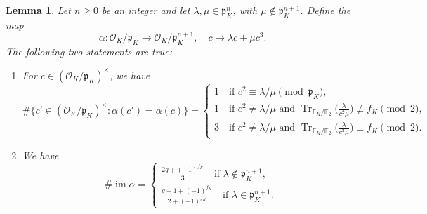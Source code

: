 \documentclass[11pt]{amsart}
\theoremstyle{theorem}
\newtheorem{lemma}[theorem]{Lemma}
\theoremstyle{example}
\theoremstyle{definition}
\numberwithin{theorem}{section}
\numberwithin{theorem}{section}
\DeclareMathOperator{\im}{im}
\DeclareMathOperator{\Tr}{Tr}
\newcommand{\co}{\mathcal{O}}
\newcommand{\F}{\mathbb{F}}
\newcommand{\p}{\mathfrak{p}}
\begin{document}
\begin{lemma}
    \label{lem-size-of-im-alpha}
    Let $n \geq 0$ be an integer and let $\lambda, \mu \in \p_K^n$, with $\mu \not \in \p_K^{n+1}$. Define the map 
    $$
    \alpha: \co_K/\p_K \to \co_K/\p_K^{n+1},\quad c\mapsto \lambda c + \mu c^3.
    $$
    The following two statements are true:
    \begin{enumerate}
    \item For $c \in (\co_K/\p_K)^\times$, we have 
    $$
    \#\{c'\in (\co_K/\p_K)^\times : \alpha(c') = \alpha(c)\} = \begin{cases}
        1 \quad \text{if $c^2 \equiv \lambda / \mu \pmod{\p_K}$},
        \\
        1 \quad \text{if $c^2 \neq \lambda/\mu$ and $\Tr_{\F_K/\F_2}\Big(\frac{\lambda}{c^2\mu}\Big) \not \equiv f_K \pmod{2}$},
        \\
        3 \quad \text{if $c^2 \neq \lambda/\mu$ and $\Tr_{\F_K/\F_2}\Big(\frac{\lambda}{c^2\mu}\Big) \equiv f_K \pmod{2}$}.
    \end{cases}
    $$
    \item We have 
    $$
    \#\im \alpha = \begin{cases}
        \frac{2q + (-1)^{f_K}}{3}\quad\text{if $\lambda \not \in \p_K^{n+1}$},
        \\
        \frac{q+1 + (-1)^{f_K}}{2 + (-1)^{f_K}}\quad\text{if $\lambda \in \p_K^{n+1}$}. 
    \end{cases}
    $$
\end{enumerate}
\end{lemma}
\end{document}
